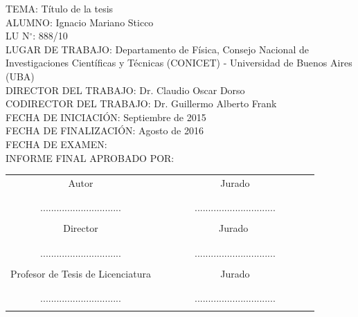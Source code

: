 \begin{flushleft}
TEMA: Título de la tesis\\

ALUMNO: Ignacio Mariano Sticco\\

LU N$^{\circ}$: 888/10 \\

LUGAR DE TRABAJO: Departamento de Física, Consejo Nacional de Investigaciones Cient\'ificas y T\'ecnicas (CONICET) - Universidad de Buenos Aires (UBA)\\

DIRECTOR DEL TRABAJO: Dr. Claudio Oscar Dorso \\

CODIRECTOR DEL TRABAJO: Dr. Guillermo Alberto Frank\\

FECHA DE INICIACI\'ON: Septiembre de 2015 \\

FECHA DE FINALIZACI\'ON: Agosto de 2016\\

FECHA DE EXAMEN:  \\

INFORME FINAL APROBADO POR:
\end{flushleft}                                                              %
\vspace{2cm}

\begin{center}
\begin{tabular}{|c|c|}
\hline
Autor &  \,\,\,\,\, \,\,\,\,\,\,\,\,\, \,\,\,\,\,\,\,\,\,\,\,\,\,\,\,\,\,\,Jurado \,\,\,\,\,\,\,\,\,\,\,\,\,\,\,\,\,\,\,\, \,\,\,\,\,\,\,\,\,\,\,\, \\
&            \\
       &            \\
  ..............................            &     ..............................          \\
       &            \\

\hline
Director &      \,\,\,\,\, \,\,\,\,\,\,\,\,\, \,\,\,\,\,\,\,\,\,\,\,\,\,\,\,\,\,\,Jurado \,\,\,\,\, \,\,\,\,\,\,\,\,\,\,\,\,\,\,\,\,\,\,\,\, \,\,\,\,\,\,\,\\
&            \\
       &            \\
  ..............................            &       ..............................        \\
         &            \\
 \hline
Profesor de Tesis de Licenciatura &  \,\,\,\,\,\,\, \,\,\,\,\, \,\,\,\,\,\,\,\,\,\,\,\,\,\,\,\,\,\,\,\,Jurado \,\,\,\,\,\,\,\,\,\,\,\,\,\,\,\,\,\,\,\,\,\,\,\,\,\,\, \,\,\,\,\,\\
&            \\
       &            \\
  ..............................            &      ..............................         \\
         &            \\
\hline
\end{tabular}
\end{center}
